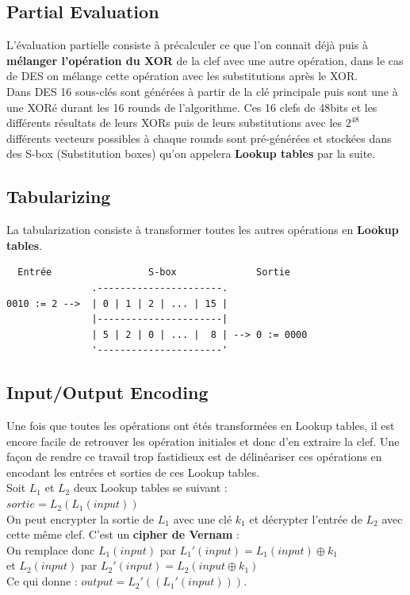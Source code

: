 \documentclass[a4paper,12pt]{article}
\begin{document}
\subsection{Partial Evaluation}

L'évaluation partielle consiste à précalculer ce que l'on connait déjà puis à \textbf{mélanger l'opération du XOR} de la clef avec une autre opération, dans le cas de DES on mélange cette opération avec les substitutions après le XOR.\\
Dans DES 16 sous-clés sont générées à partir de la clé principale puis sont une à une XORé durant les 16 rounds de l'algorithme. Ces 16 clefs de 48bits et les différents résultats de leurs XORs puis de leurs substitutions avec les $2^{48}$ différents vecteurs possibles à chaque rounds sont pré-générées et stockées dans des S-box (Substitution boxes) qu'on appelera \textbf{Lookup tables} par la suite.


\subsection{Tabularizing}

La tabularization consiste à transformer toutes les autres opérations en \textbf{Lookup tables}.

\begin{verbatim}
  Entrée                 S-box              Sortie
               .----------------------.
0010 := 2 -->  | 0 | 1 | 2 | ... | 15 |
               |----------------------|
               | 5 | 2 | 0 | ... |  8 | --> 0 := 0000
               '----------------------'
\end{verbatim}


\subsection{Input/Output Encoding}

Une fois que toutes les opérations ont étés transformées en Lookup tables, il est encore facile de retrouver les opération initiales et donc d'en extraire la clef. Une façon de rendre ce travail trop fastidieux est de délinéariser ces opérations en encodant les entrées et sorties de ces Lookup tables.\\

Soit $L_1$ et $L_2$ deux Lookup tables se suivant :\\
$sortie = L_2(L_1(input))$\\
On peut encrypter la sortie de $L_1$ avec une clé $k_1$ et décrypter l'entrée de $L_2$ avec cette même clef. C'est un \textbf{cipher de Vernam} :\\
On remplace donc $L_1(input)$ par $L_1'(input) = L_1(input) \oplus k_1$\\
et $L_2(input)$ par $L_2'(input) = L_2(input \oplus k_1)$\\
Ce qui donne : $output = L_2'((L_1'(input)))$.\\
\end{document}
